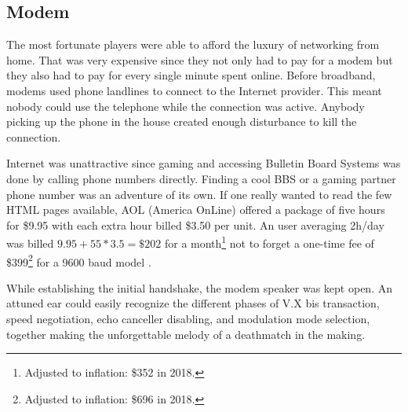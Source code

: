 \subsection{Modem}
The most fortunate players were able to afford the luxury of networking from home. That was very expensive since they not only had to pay for a modem but they also had to pay for every single minute spent online. Before broadband, modems used phone landlines to connect to the Internet provider. This meant nobody could use the telephone while the connection was active. Anybody picking up the phone in the house created enough disturbance to kill the connection.\\
\par
Internet was unattractive since gaming and accessing Bulletin Board Systems was done by calling phone numbers directly. Finding a cool BBS or a gaming partner phone number was an adventure of its own. If one really wanted to read the few HTML pages available, AOL (America OnLine) offered a package of five hours for \$9.95 with each extra hour billed \$3.50 per unit. An user averaging 2h/day was billed $9.95 + 55 * 3.5 = \$202 $ for a month\footnote{Adjusted to inflation: \$352 in 2018.} not to forget a one-time fee of \$399\footnote{Adjusted to inflation: \$696 in 2018.} for a 9600 baud model .\\
\par
{}

 While establishing the initial handshake, the modem speaker was kept open. An attuned ear could easily recognize the different phases of V.X bis transaction, speed negotiation, echo canceller disabling, and modulation mode selection, together making the unforgettable melody of a deathmatch in the making.\\
 \par 
{}
\par
 
